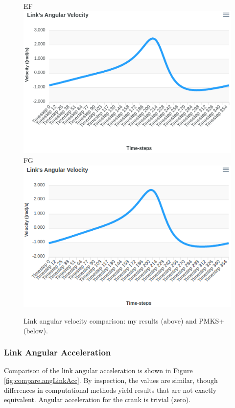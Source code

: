 \documentclass[12pt]{article}
\begin{document}
\begin{figure}[ht]
  EF \includegraphics[scale=0.4]{../pmks-plots/angLinkVel/angLinkVelEF.png}%
  FG \includegraphics[scale=0.4]{../pmks-plots/angLinkVel/angLinkVelFG.png}%
  \caption{\label{fig:compare.angLinkVel}Link angular velocity comparison: my results (above) and PMKS+ (below).}
\end{figure}

\subsubsection{Link Angular Acceleration}%
\label{res.compare.angLinkAcc}

Comparison of the link angular acceleration is shown in Figure \ref{fig:compare.angLinkAcc}. By inspection, the values are similar, though differences in computational methods yield results that are not exactly equivalent. Angular acceleration for the crank is trivial (zero).
\end{document}
